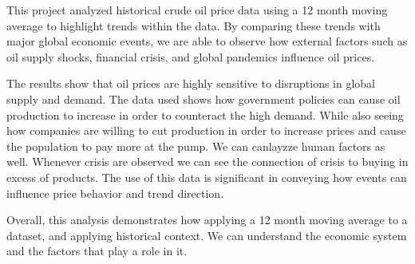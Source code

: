 This project analyzed historical crude oil price data using a 12 month moving average to highlight trends within the data. By comparing these trends with major global economic events, we are able to observe how external factors such as oil supply shocks, financial crisis, and global pandemics influence oil prices.

The results show that oil prices are highly sensitive to disruptions in global supply and demand. The data used shows how government policies can cause oil production to increase in order to counteract the high demand. While also seeing how companies are willing to cut production in order to increase prices and cause the population to pay more at the pump. We can canlayzze human factors as well. Whenever crisis are observed we can see the connection of crisis to buying in excess of products. The use of this data is significant in conveying how events can influence price behavior and trend direction. 

Overall, this analysis demonstrates how applying a 12 month moving average to a dataset, and applying historical context. We can understand the economic system and the factors that play a role in it.

